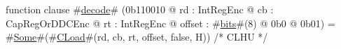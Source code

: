 function clause #\hyperref[sailMIPSzdecode]{decode}# (0b110010 @ rd : IntRegEnc @ cb : CapRegOrDDCEnc @ rt : IntRegEnc @ offset : #\hyperref[sailMIPSzbits]{bits}#(8) @ 0b0 @ 0b01) = #\hyperref[sailMIPSzSome]{Some}#(#\hyperref[sailMIPSzCLoad]{CLoad}#(rd, cb, rt, offset, false, H)) /* CLHU */
